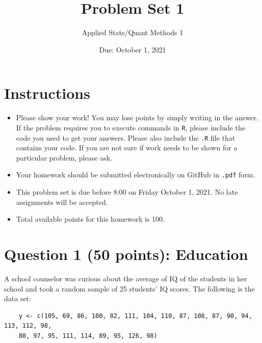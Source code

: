 \documentclass[12pt,letterpaper]{article}
\title{Problem Set 1}
\date{Due: October 1, 2021}
\author{Applied Stats/Quant Methods 1}
\begin{document}
	\maketitle
	
	\section*{Instructions}
	\begin{itemize}
		\item Please show your work! You may lose points by simply writing in the answer. If the problem requires you to execute commands in \texttt{R}, please include the code you used to get your answers. Please also include the \texttt{.R} file that contains your code. If you are not sure if work needs to be shown for a particular problem, please ask.
		\item Your homework should be submitted electronically on GitHub in \texttt{.pdf} form.
		\item This problem set is due before 8:00 on Friday October 1, 2021. No late assignments will be accepted.
		\item Total available points for this homework is 100.
	\end{itemize}
	
	\vspace{1cm}
	\section*{Question 1 (50 points): Education}

A school counselor was curious about the average of IQ of the students in her school and took a random sample of 25 students' IQ scores. The following is the data set:\\
\vspace{.25cm}

\begin{verbatim}
    y <- c(105, 69, 86, 100, 82, 111, 104, 110, 87, 108, 87, 90, 94, 113, 112, 98, 
    80, 97, 95, 111, 114, 89, 95, 126, 98)
\end{verbatim}  
\end{document}

